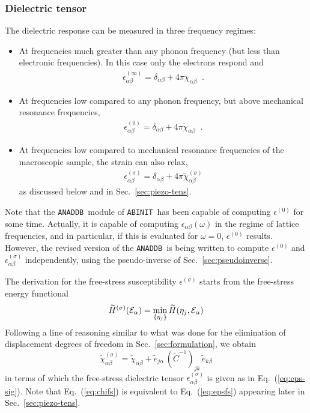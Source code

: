 \documentclass[11pt,fleqn]{article}
\def\bea{\begin{eqnarray}}
\def\eea{\end{eqnarray}}
\def\beq{\begin{equation}}
\def\eeq{\end{equation}}
\def\wt#1{\widetilde{#1}}
\def\E{{\cal E}}
\def\eps{\epsilon}
\def\ABINIT{{{\tt ABINIT}}}
\def\ANADDB{{\tt ANADDB}}
\begin{document}
\subsubsection{Dielectric tensor}
\label{sec:eps-free-stress}

The dielectric response can be measured in three frequency
regimes:
%
\begin{itemize}
\item At frequencies much greater than any phonon frequency (but less
than electronic frequencies).  In this case only the electrons respond
and
%
\bea
\eps^{(\infty)}_{\alpha\beta}=\delta_{\alpha\beta}+4\pi\chi_{\alpha\beta}
\;\;.
\eea
%
\item At frequencies low compared to any phonon frequency, but above
mechanical resonance frequencies,
%
\bea
\eps^{(0)}_{\alpha\beta}=\delta_{\alpha\beta}+4\pi\wt{\chi}_{\alpha\beta}
\;\;.
\eea
%
\item At frequencies low compared to mechanical resonance frequencies of
the macroscopic sample, the strain can also relax,
%
\bea
\eps^{(\sigma)}_{\alpha\beta}=\delta_{\alpha\beta}+
    4\pi\wt{\chi}^{(\sigma)}_{\alpha\beta}
\label{eq:eps-sig}
\eea
%
as discussed below and in Sec.~\ref{sec:piezo-tens}.
\end{itemize}

Note that the \ANADDB\ module of \ABINIT\ has been capable of computing
$\eps^{(0)}$ for some time.  Actually, it is capable of computing
$\eps_{\alpha\beta}(\omega)$ in the regime of lattice frequencies, and
in particular, if this is evaluated for $\omega=0$, $\eps^{(0)}$
results.  However, the revised version of the \ANADDB\ is being
written to compute $\eps^{(0)}$ and $\eps^{(\sigma)}_{\alpha\beta}$
independently, using the pseudo-inverse of Sec.~\ref{sec:pseudoinverse}.

The derivation for the
free-stress susceptibility $\eps^{(\sigma)}$ starts from the
free-stress energy functional
%
\beq
\wt{H}^{(\sigma)}(\E_\alpha)=\min_{\{\eta_j\}} \wt{H}(\eta_j,\E_\alpha)
\eeq
%
Following a line of reasoning similar to what was done for the
elimination of displacement degrees of freedom in
Sec.~\ref{sec:formulation}, we obtain
%
\beq
\wt{\chi}^{(\sigma)}_{\alpha\beta} = \wt{\chi}_{\alpha\beta}
   + \wt{e}_{j\alpha}\,(\wt{C}^{-1})_{jk}\,\wt{e}_{k\beta}
\label{eq:chifs}
\eeq
%
in terms of which the free-stress dielectric
tensor $\eps^{(\sigma)}_{\alpha\beta}$ is given as in
Eq.~(\ref{eq:eps-sig}).
Note that Eq.~(\ref{eq:chifs}) is equivalent to Eq.~(\ref{eq:epsfs})
appearing later in Sec.~\ref{sec:piezo-tens}.
\end{document}
